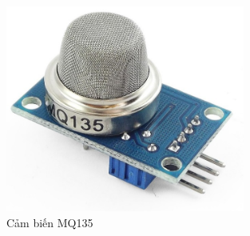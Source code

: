 \begin{center}
\begin{figure}[htp]
\centering    
\includegraphics[width=0.7\textwidth]{mq135}
\caption[Cảm biến MQ135]{Cảm biến MQ135}
\label{fig:mq135}
\end{figure}
\end{center}

